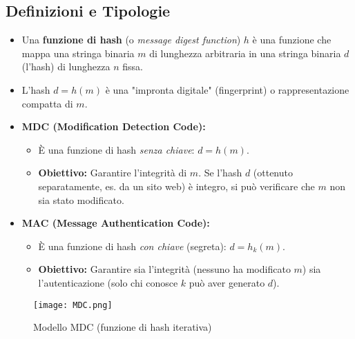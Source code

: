 \documentclass[../main.tex]{subfiles}
\begin{document}
\subsection{Definizioni e Tipologie}
\begin{itemize}
	\item Una \textbf{funzione di hash} (o \emph{message digest function}) $h$ è una funzione che mappa una stringa binaria $m$ di lunghezza arbitraria in una stringa binaria $d$ (l'hash) di lunghezza $n$ fissa.
	\item L'hash $d=h(m)$ è una "impronta digitale" (fingerprint) o rappresentazione compatta di $m$.
	\item \textbf{MDC (Modification Detection Code):}
	      \begin{itemize}
	      	\item È una funzione di hash \emph{senza chiave}: $d = h(m)$.
	      	\item \textbf{Obiettivo:} Garantire l'integrità di $m$. Se l'hash $d$ (ottenuto separatamente, es. da un sito web) è integro, si può verificare che $m$ non sia stato modificato.
	      \end{itemize}
	\item \textbf{MAC (Message Authentication Code):}
	      \begin{itemize}
	      	\item È una funzione di hash \emph{con chiave} (segreta): $d = h_k(m)$.
	      	\item \textbf{Obiettivo:} Garantire sia l'integrità (nessuno ha modificato $m$) sia l'autenticazione (solo chi conosce $k$ può aver generato $d$).
	      \end{itemize}
\end{itemize}

\begin{figure}[H]
	\centering
	\texttt{[image: MDC.png]}
	\caption{Modello MDC (funzione di hash iterativa)}
	\label{fig:etichetta}
\end{figure}
\end{document}
